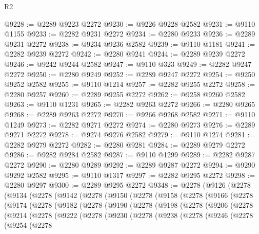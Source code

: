 \begin{lexlean}{R2}
\begin{coremodule}
@9228 := @2289 @9223 @2272
@9230 := @9226 @9228 @2582
@9231 := @9110 @1155
@9233 := @2282 @9231 @2272
@9234 := @2280 @9233
@9236 := @2289 @9231 @2272
@9238 := @9234 @9236 @2582
@9239 := @9110 @1181
@9241 := @2282 @9239 @2272
@9242 := @2280 @9241
@9244 := @2289 @9239 @2272
@9246 := @9242 @9244 @2582
@9247 := @9110 @323
@9249 := @2282 @9247 @2272
@9250 := @2280 @9249
@9252 := @2289 @9247 @2272
@9254 := @9250 @9252 @2582
@9255 := @9110 @1214
@9257 := @2282 @9255 @2272
@9258 := @2280 @9257
@9260 := @2289 @9255 @2272
@9262 := @9258 @9260 @2582
@9263 := @9110 @1231
@9265 := @2282 @9263 @2272
@9266 := @2280 @9265
@9268 := @2289 @9263 @2272
@9270 := @9266 @9268 @2582
@9271 := @9110 @1249
@9273 := @2282 @9271 @2272
@9274 := @2280 @9273
@9276 := @2289 @9271 @2272
@9278 := @9274 @9276 @2582
@9279 := @9110 @1274
@9281 := @2282 @9279 @2272
@9282 := @2280 @9281
@9284 := @2289 @9279 @2272
@9286 := @9282 @9284 @2582
@9287 := @9110 @1299
@9289 := @2282 @9287 @2272
@9290 := @2280 @9289
@9292 := @2289 @9287 @2272
@9294 := @9290 @9292 @2582
@9295 := @9110 @1317
@9297 := @2282 @9295 @2272
@9298 := @2280 @9297
@9300 := @2289 @9295 @2272
@9348 := @2278
    (@9126
      (@2278
        (@9134
          (@2278
            (@9142
              (@2278
                (@9150
                  (@2278
                    (@9158
                      (@2278
                        (@9166
                          (@2278
                            (@9174
                              (@2278
                                (@9182
                                  (@2278
                                    (@9190
                                      (@2278
                                        (@9198
                                          (@2278
                                            (@9206
                                              (@2278
                                                (@9214
                                                  (@2278
                                                    (@9222
                                                      (@2278
                                                        (@9230
                                                          (@2278
                                                            (@9238
                                                              (@2278
                                                                (@9246
                                                                  (@2278
                                                                    (@9254
                                                                      (@2278

\end{coremodule}
\end{lexlean}
